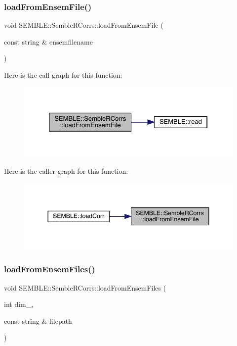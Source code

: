 \subsubsection{\texorpdfstring{loadFromEnsemFile()}{loadFromEnsemFile()}}
{\footnotesize\ttfamily void S\+E\+M\+B\+L\+E\+::\+Semble\+R\+Corrs\+::load\+From\+Ensem\+File (\begin{DoxyParamCaption}\item[{const string \&}]{ensemfilename }\end{DoxyParamCaption})}

Here is the call graph for this function\+:
\nopagebreak
\begin{figure}[H]
\begin{center}
\leavevmode
\includegraphics[width=326pt]{d4/d78/classSEMBLE_1_1SembleRCorrs_a1695e747d8b6469c3bcf538cea18500b_cgraph}
\end{center}
\end{figure}
Here is the caller graph for this function\+:
\nopagebreak
\begin{figure}[H]
\begin{center}
\leavevmode
\includegraphics[width=344pt]{d4/d78/classSEMBLE_1_1SembleRCorrs_a1695e747d8b6469c3bcf538cea18500b_icgraph}
\end{center}
\end{figure}
\mbox{\label{classSEMBLE_1_1SembleRCorrs_a0bf9a1942cfecded7e4decd08ee54dcf}} 
\subsubsection{\texorpdfstring{loadFromEnsemFiles()}{loadFromEnsemFiles()}}
{\footnotesize\ttfamily void S\+E\+M\+B\+L\+E\+::\+Semble\+R\+Corrs\+::load\+From\+Ensem\+Files (\begin{DoxyParamCaption}\item[{int}]{dim\+\_\+,  }\item[{const string \&}]{filepath }\end{DoxyParamCaption})}

